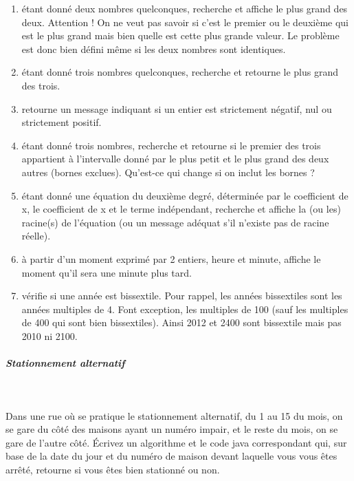 \documentclass[11pt,a4paper]{article}
\begin{document}
					\begin{enumerate}
				
			\item \'etant donn\'e deux nombres quelconques, recherche et affiche le plus
              grand des deux. Attention ! On ne veut pas savoir si c'est le premier ou le deuxi\`eme qui est
              le plus grand mais bien quelle est cette plus grande valeur. Le probl\`eme est donc bien d\'efini
              m\^eme si les deux nombres sont identiques.
            
			\item \'etant donn\'e trois nombres quelconques, recherche et retourne le plus grand des trois.
			\item retourne un message indiquant si un entier est strictement n\'egatif, nul ou strictement positif.
			\item \'etant donn\'e trois nombres, recherche et retourne si le premier des 
            trois appartient \`a l'intervalle donn\'e par le plus petit et le plus grand des deux autres (bornes exclues). 
            Qu'est-ce qui change si on inclut les bornes ?
			\item \'etant donn\'e une \'equation du deuxi\`eme degr\'e, d\'etermin\'ee par le coefficient de x\texttwosuperior  , le coefficient de x et le terme ind\'ependant, 
            recherche et affiche la (ou les) racine(s) de l'\'equation (ou un message ad\'equat s'il n'existe pas de racine r\'eelle).
			\item \`a partir d'un moment exprim\'e par 2 entiers, heure et minute, affiche le moment qu'il sera une minute plus tard.
			\item v\'erifie si une ann\'ee est bissextile. Pour rappel, les ann\'ees bissextiles sont les ann\'ees multiples de 4.
              Font exception, les multiples de 100 (sauf les multiples de 400 qui sont bien bissextiles). Ainsi 2012 et 2400 sont bissextile mais pas 2010 ni 2100.
					\end{enumerate}
				
            \par
        
			
		\subparagraph{Stationnement alternatif} 
		
					\textcolor{white}{.} \par
				
          Dans une rue o\`u se pratique le stationnement alternatif, du 1 au 15 du mois, on se gare du c\^ot\'e des maisons ayant un num\'ero impair, 
          et le reste du mois, on se gare de l'autre c\^ot\'e.
          \'Ecrivez un algorithme et le code java correspondant qui, sur base de la date du jour et du num\'ero de maison devant laquelle
          vous vous \^etes arr\^et\'e, retourne si vous \^etes bien stationn\'e ou non.
        
\end{document}
